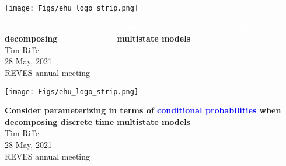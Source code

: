 \documentclass[20pt,usenames,dvipsnames]{beamer}
\newcommand{\white}[1]{\textcolor{white}{#1}}
\newcommand{\blue}[1]{\textcolor{blue}{#1}}
\begin{document}

\begin{frame}[plain]
	\vspace{.5cm}
 \centerline{\texttt{[image: Figs/ehu\_logo\_strip.png]}}

	\huge
	\vspace{1em}
	\textbf{\white{Consider parameterizing in terms of conditional probabilities when} decomposing \white{discrete time} multistate models}\\
	\vspace{1em}
	\large 
	Tim Riffe \\
	\vspace{1em}
	28 May, 2021\\
	REVES annual meeting
\end{frame}

%



\begin{frame}[plain]
	\vspace{.5cm}
 \centerline{\texttt{[image: Figs/ehu\_logo\_strip.png]}}

	\huge
	\vspace{1em}
	
	\textbf{Consider parameterizing in terms of \blue{conditional probabilities} when decomposing discrete time multistate models}\\
	\vspace{1em}
	\large 
	Tim Riffe \\
	\vspace{1em}
	28 May, 2021\\
	REVES annual meeting
\end{frame}
\end{document}
